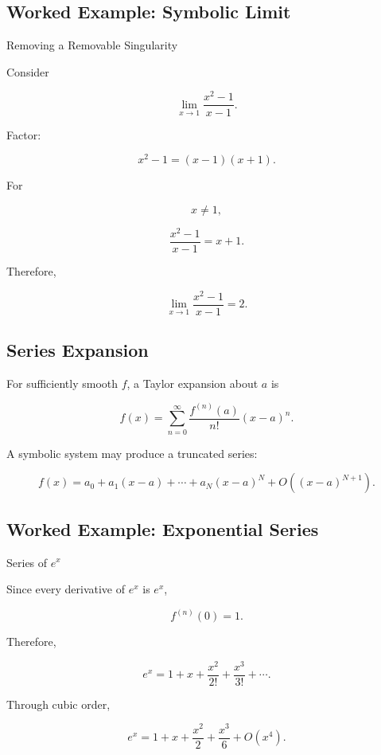 \subsection{Worked Example: Symbolic Limit}
\label{subsec:worked-symbolic-limit}

\begin{workedexamplebox}{Removing a Removable Singularity}

Consider

\[
\lim_{x\to1}
\frac{
x^2-1
}{
x-1
}.
\]

Factor:

\[
x^2-1
=
(x-1)(x+1).
\]

For

\[
x\neq1,
\]

\[
\frac{
x^2-1
}{
x-1
}
=
x+1.
\]

Therefore,

\begin{answerbox}
\[
\boxed{
\lim_{x\to1}
\frac{
x^2-1
}{
x-1
}
=
2.
}
\]
\end{answerbox}

\end{workedexamplebox}

\subsection{Series Expansion}
\label{subsec:symbolic-series-expansion}

For sufficiently smooth \(f\), a Taylor expansion about \(a\) is

\[
\boxed{
f(x)
=
\sum_{n=0}^{\infty}
\frac{
f^{(n)}(a)
}{
n!
}
(x-a)^n.
}
\]

A symbolic system may produce a truncated series:

\[
\boxed{
f(x)
=
a_0
+
a_1(x-a)
+
\cdots
+
a_N(x-a)^N
+
O((x-a)^{N+1}).
}
\]

\subsection{Worked Example: Exponential Series}
\label{subsec:worked-exponential-series}

\begin{workedexamplebox}{Series of \(e^x\)}

Since every derivative of \(e^x\) is \(e^x\),

\[
f^{(n)}(0)=1.
\]

Therefore,

\[
e^x
=
1
+
x
+
\frac{x^2}{2!}
+
\frac{x^3}{3!}
+
\cdots.
\]

Through cubic order,

\begin{answerbox}
\[
\boxed{
e^x
=
1+x+\frac{x^2}{2}+\frac{x^3}{6}+O(x^4).
}
\]
\end{answerbox}

\end{workedexamplebox}


